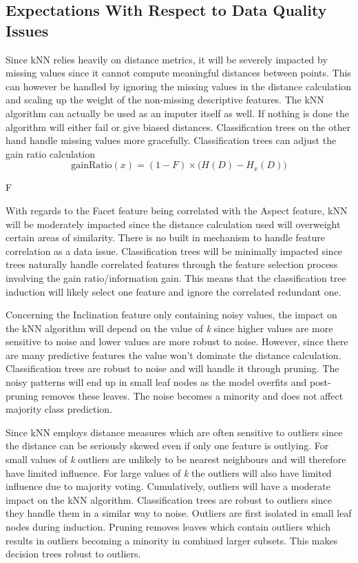 \documentclass[10pt, conference]{IEEEtran}
\begin{document}
\subsection{Expectations With Respect to Data Quality Issues}
Since kNN relies heavily on distance metrics, it will be severely impacted by missing values since it cannot compute meaningful distances between points. This can however be handled by ignoring the missing values in the distance calculation and scaling up the weight of the non-missing descriptive features. The kNN algorithm can actually be used as an imputer itself as well. If nothing is done the algorithm will either fail or give biased distances. Classification trees on the other hand handle missing values more gracefully. Classification trees can adjust the gain ratio calculation 
\[
\text{gainRatio}(x) = (1 - F) \times \big( H(D) - H_x(D) \big)
\]

 F 



With regards to the Facet feature being correlated with the Aspect feature, kNN will be moderately impacted since the distance calculation used will overweight certain areas of similarity. There is no built in mechanism to handle feature correlation as a data issue. Classification trees will be minimally impacted since trees naturally handle correlated features through the feature selection process involving the gain ratio/information gain. This means that the classification tree induction will likely select one feature and ignore the correlated redundant one.

Concerning the Inclination feature only containing noisy values, the impact on the kNN algorithm will depend on the value of \textit{k} since higher values are more sensitive to noise and lower values are more robust to noise. However, since there are many predictive features the value won't dominate the distance calculation. Classification trees are robust to noise and will handle it through pruning. The noisy patterns will end up in small leaf nodes as the model overfits and post-pruning removes these leaves. The noise becomes a minority and does not affect majority class prediction.

Since kNN employs distance measures which are often sensitive to outliers since the distance can be seriously skewed even if only one feature is outlying. For small values of \textit{k} outliers are unlikely to be nearest neighbours and will therefore have limited influence. For large values of \textit{k} the outliers will also have limited influence due to majority voting. Cumulatively, outliers will have a moderate impact on the kNN algorithm. Classification trees are robust to outliers since they handle them in a similar way to noise. Outliers are first isolated in small leaf nodes during induction. Pruning removes leaves which contain outliers which results in outliers becoming a minority in combined larger subsets. This makes decision trees robust to outliers.
\end{document}
